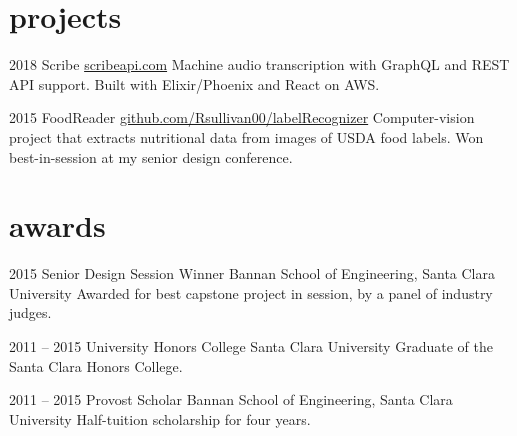 \documentclass[]{friggeri-cv} %
\begin{document}

\section{projects}

\begin{entrylist}

\entry
{2018}
{Scribe}
{\href{https://scribeapi.com}{scribeapi.com}}
{Machine audio transcription with GraphQL and REST API support. Built with Elixir/Phoenix and React on AWS.}

\entry
{2015}
{FoodReader}
{\href{https://github.com/Rsullivan00/labelRecognizer}{github.com/Rsullivan00/labelRecognizer}}
{Computer-vision project that extracts nutritional data from images of USDA food labels. Won best-in-session at my senior design conference.}



\end{entrylist}




\section{awards}

\begin{entrylist}

\entry
{2015}
{Senior Design Session Winner}
{Bannan School of Engineering, Santa Clara University}
{Awarded for best capstone project in session, by a panel of industry judges.}

\entry
{2011 -- 2015}
{University Honors College}
{Santa Clara University}
{Graduate of the Santa Clara Honors College.}

\entry
{2011 -- 2015}
{Provost Scholar}
{Bannan School of Engineering, Santa Clara University}
{Half-tuition scholarship for four years.}


\end{entrylist}
\end{document}
